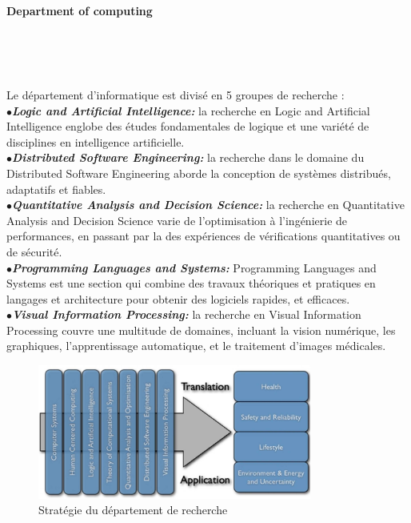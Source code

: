 \documentclass[10pt]{report}
\begin{document}
	
	\paragraph{Department of computing}~\par~\par
	Le département d'informatique est divisé en 5 groupes de recherche : %
	\\{$\bullet$}\textit{\textbf{Logic and Artificial Intelligence:}} la recherche en Logic and Artificial Intelligence englobe des études fondamentales de logique et une variété de disciplines en intelligence artificielle.
	\\{$\bullet$}\textit{\textbf{Distributed Software Engineering:}}	la recherche dans le domaine du Distributed Software Engineering aborde la conception de systèmes distribués, adaptatifs et fiables.
	\\{$\bullet$}\textit{\textbf{Quantitative Analysis and Decision Science:}} la recherche en Quantitative Analysis and Decision Science varie de l'optimisation à l'ingénierie de performances, en passant par la des expériences de vérifications quantitatives ou de sécurité.
	\\{$\bullet$}\textit{\textbf{Programming Languages and Systems:}} Programming Languages and Systems est une section qui combine des travaux théoriques et pratiques en langages et architecture pour obtenir des logiciels rapides, et efficaces.
	\\{$\bullet$}\textit{\textbf{Visual Information Processing:}} la recherche en Visual Information Processing couvre une multitude de domaines, incluant la vision numérique, les graphiques, l'apprentissage automatique, et le traitement d'images médicales. 
	\begin{figure}
		\includegraphics[width=9cm]{Reports/figures/research_strategy.jpg}
		\caption{Stratégie du département de recherche}
		\label{Stratégie du département de recherche}
	\end{figure}~\par~\par
	
\end{document}
